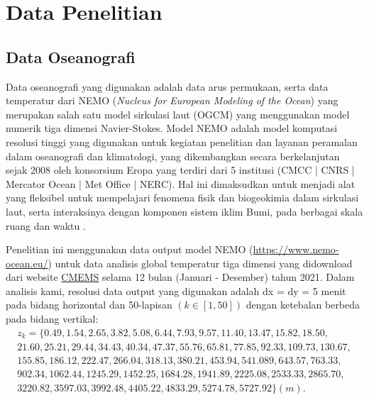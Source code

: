 \section[Data Penelitian]{Data Penelitian}
\begin{spacing}{1.5}
\vspace{-1pc}
\subsection[Data Oseanografi]{Data Oseanografi}
	Data oseanografi yang digunakan adalah data arus permukaan, serta data temperatur dari NEMO (\textit{Nucleus for European Modeling of the Ocean}) yang merupakan salah satu model sirkulasi laut (OGCM) yang menggunakan model numerik tiga dimensi Navier-Stokes. Model NEMO adalah model komputasi resolusi tinggi yang digunakan untuk kegiatan penelitian dan layanan peramalan dalam oseanografi dan klimatologi, yang dikembangkan secara berkelanjutan sejak 2008 oleh konsorsium Eropa yang terdiri dari 5 institusi (CMCC | CNRS | Mercator Ocean | Met Office | NERC). Hal ini dimaksudkan untuk menjadi alat yang fleksibel untuk mempelajari fenomena fisik dan biogeokimia dalam sirkulasi laut, serta interaksinya dengan komponen sistem iklim Bumi, pada berbagai skala ruang dan waktu . 
	
	Penelitian ini menggunakan data output model NEMO (\href{https://www.nemo-ocean.eu/}{https://www.nemo-ocean.eu/}) untuk data analisis global temperatur tiga dimensi yang didownload dari website \href{https://resources.marine.copernicus.eu/products}{CMEMS} selama 12 bulan (Januari - Desember) tahun 2021.  Dalam analisis kami, resolusi data output yang digunakan adalah dx = dy = 5 menit pada bidang horizontal dan 50-lapisan $(k \in [1,50])$ dengan ketebalan berbeda pada bidang vertikal:
	\begin{equation*}
		\begin{aligned}
			z_k = \{0.49, 1.54, 2.65, 3.82, 5.08, 6.44, 7.93, 9.57, 11.40, 13.47, 15.82, 18.50, \\
			21.60, 25.21, 29.44, 34.43, 40.34, 47.37, 55.76, 65.81, 77.85, 92.33, 109.73, 130.67, \\
			155.85, 186.12, 222.47, 266.04, 318.13, 380.21, 453.94, 541.089, 643.57, 763.33, \\
			902.34, 1062.44, 1245.29, 1452.25, 1684.28, 1941.89, 2225.08, 2533.33, 2865.70,  \\
			3220.82, 3597.03, 3992.48, 4405.22, 4833.29, 5274.78, 5727.92 \} (m). \\
		\end{aligned}
	\end{equation*}

\end{spacing}
